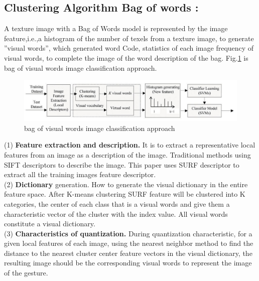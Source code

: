 \subsection{Clustering Algorithm Bag of words :}
A texture image with a Bag of Words
model is represented by the image feature,i.e.,a histogram of
the number of texels from a texture image, to generate ”visual
words”, which generated word Code, statistics of each image
frequency of visual words, to complete the image of the word
description of the bag. Fig.\ref{fig:bag} is bag of visual words image
classiﬁcation approach.\\
\begin{figure}[H]
\centering
\includegraphics[width=1.0\textwidth]{img/BAG.jpg}
\caption{ bag of visual words image classification approach   }
\label{fig:bag}
\end{figure}
(1) \textbf{Feature extraction and description.} It is to extract a representative local features from an image as a description of the image. Traditional methods using SIFT descriptors to
describe the image. This paper uses SURF  descriptor
to extract all the training images feature descriptor. \\(2)\textbf{ Dictionary}
generation. How to generate the visual dictionary in the
entire feature space. After K-means clustering SURF 
feature will be clustered into K categories, the center of each class that is a visual words and give them a characteristic vector of the cluster with the index value. All visual words constitute
a visual dictionary. \\(3)\textbf{ Characteristics of quantization.} During
quantization characteristic, for a given local features of each
image, using the nearest neighbor method to find the distance
to the nearest cluster center feature vectors in the visual
dictionary, the resulting image should be the corresponding
visual words to represent the image of the gesture.\\


